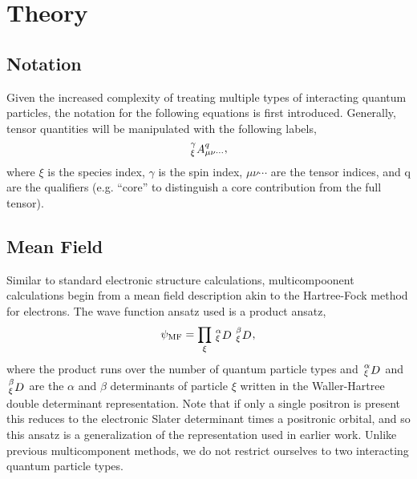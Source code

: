 \section{Theory}
\subsection{Notation}
Given the increased complexity of treating multiple types of interacting quantum particles, the notation for the following equations is first introduced.
Generally, tensor quantities will be manipulated with the following labels,
\begin{equation}
   \shivten{\gamma}{\xi}{A}{q}{\mu\nu\cdots},
\end{equation}
where $\xi$ is the species index, $\gamma$ is the spin index, $\mu\nu\cdots$ are the tensor indices, and q are the qualifiers (e.g. ``core'' to distinguish a core contribution from the full tensor).

\subsection{Mean Field}

Similar to standard electronic structure calculations, multicompoonent calculations begin from a mean field description akin to the Hartree-Fock method for electrons.
The wave function ansatz used is a product ansatz, 
\begin{equation}
    \psi_{\textrm{MF}} = \prod_{\xi} \shivten{\alpha}{\xi}{D}{}{} \shivten{\beta}{\xi}{D}{}{},
\end{equation}
where the product runs over the number of quantum particle types and $\shivten{\alpha}{\xi}{D}{}{}$ and $\shivten{\beta}{\xi}{D}{}{}$ are the $\alpha$ and $\beta$ determinants of particle $\xi$ written in the Waller-Hartree double determinant representation.\citehere
Note that if only a single positron is present this reduces to the electronic Slater determinant times a positronic orbital, and so this ansatz is a generalization of the representation used in earlier work.\cite{10.1088/0022-3700/11/16/001, 10.1088/0022-3700/12/15/007,10.1063/1.438933,10.1063/1.442211,10.1088/0022-3700/14/22/019}
Unlike previous multicomponent methods, we do not restrict ourselves to two interacting quantum particle types.

